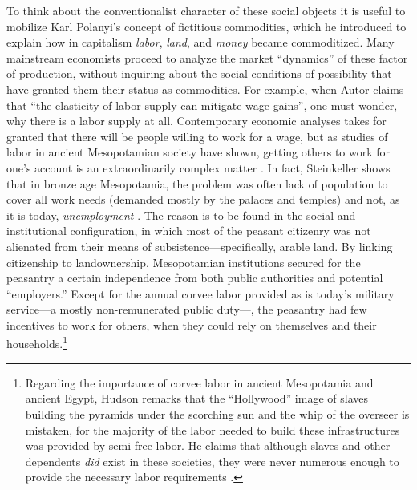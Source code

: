 \documentclass[version=last,draft=false,paper=A4,portrait,twoside=true,twocolumn=false,headinclude=false,footinclude=false,mpinclude=true,fontsize=12,BCOR=20mm,DIV=calc,pagesize=auto,open=right,chapterprefix=true,numbers=autoendperiod,headsepline=false,headings=twolinechapter,parskip=false]{scrbook}
\begin{document}
To think about the conventionalist character of these social objects it is
 useful to mobilize Karl Polanyi's concept of fictitious commodities, which
 he introduced to explain how in capitalism \emph{labor}, \emph{land}, and \emph{money} became
 commoditized. Many mainstream economists proceed to analyze the market
 ``dynamics'' of these factor of production, without inquiring about the
 social conditions of possibility that have granted them their status as
 commodities. For example, when Autor claims that ``the elasticity of labor
 supply can mitigate wage gains'', one must wonder, why there is a labor
 supply at all. Contemporary economic analyses takes for granted that there
 will be people willing to work for a wage, but as studies of labor in
 ancient Mesopotamian society have shown, getting others to work for one's
 account is an extraordinarily complex matter
 \autocite[p. 5]{steinkeller2015}. In fact, Steinkeller shows that in
 bronze age Mesopotamia, the problem was often lack of population to cover
 all work needs (demanded mostly by the palaces and temples) and not, as it
 is today, \emph{unemployment} \autocite[pp. 9--19]{steinkeller2015}. The reason
 is to be found in the social and institutional configuration, in which
 most of the peasant citizenry was not alienated from their means of
 subsistence---specifically, arable land. By linking citizenship to
 landownership, Mesopotamian institutions secured for the peasantry a
 certain independence from both public authorities and potential
 ``employers.'' Except for the annual corvee labor provided as is today's
 military service---a mostly non-remunerated public duty---, the peasantry
 had few incentives to work for others, when they could rely on themselves
 and their households.\footnote{Regarding the importance of corvee labor in ancient Mesopotamia and
ancient Egypt, Hudson remarks that the ``Hollywood'' image of slaves
building the pyramids under the scorching sun and the whip of the overseer
is mistaken, for the majority of the labor needed to build these
infrastructures was provided by semi-free labor. He claims that although
slaves and other dependents \emph{did} exist in these societies, they were never
numerous enough to provide the necessary labor requirements
\autocite[p. 649]{hudson2015}.}
\end{document}
